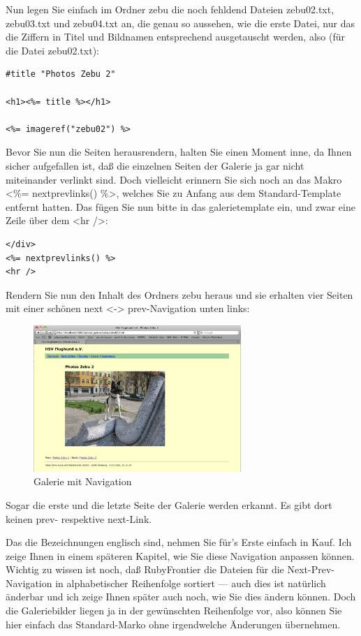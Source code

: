 \documentclass[11pt]{report}
\begin{document}
Nun legen Sie einfach im Ordner zebu die noch fehldend Dateien
zebu02.txt, zebu03.txt und zebu04.txt an, die genau so aussehen, wie
die erste Datei, nur das die Ziffern in Titel und Bildnamen
entsprechend ausgetauscht werden, also (für die Datei zebu02.txt):


\begin{verbatim}
#title "Photos Zebu 2"

<h1><%= title %></h1>

<%= imageref("zebu02") %>
\end{verbatim}

Bevor Sie nun die Seiten herausrendern, halten Sie einen Moment inne,
da Ihnen sicher aufgefallen ist, daß die einzelnen Seiten der Galerie
ja gar nicht miteinander verlinkt sind. Doch vielleicht erinnern Sie
sich noch an das Makro <\%= nextprevlinks() \%>, welches Sie zu Anfang
aus dem Standard-Template entfernt hatten. Das fügen Sie nun bitte in
das galerietemplate ein, und zwar eine Zeile über dem <hr />:


\begin{verbatim}
</div>
<%= nextprevlinks() %>
<hr />
\end{verbatim}

Rendern Sie nun den Inhalt des Ordners zebu heraus und sie erhalten
vier Seiten mit einer schönen next <-> prev-Navigation unten links:

\begin{figure}[h!]
\centering
\includegraphics[width=0.7\textwidth]{./images/galerie05.png}
\caption{\label{galerie05}Galerie mit Navigation}
\end{figure}

Sogar die erste und die letzte Seite der Galerie werden erkannt. Es
gibt dort keinen prev- respektive next-Link.


Das die Bezeichnungen englisch sind, nehmen Sie für’s Erste einfach in
Kauf. Ich zeige Ihnen in einem späteren Kapitel, wie Sie diese
Navigation anpassen können. Wichtig zu wissen ist noch, daß
RubyFrontier die Dateien für die Next-Prev-Navigation in
alphabetischer Reihenfolge sortiert — auch dies ist natürlich änderbar
und ich zeige Ihnen später auch noch, wie Sie dies ändern können. Doch
die Galeriebilder liegen ja in der gewünschten Reihenfolge vor, also
können Sie hier einfach das Standard-Marko ohne irgendwelche
Änderungen übernehmen.
\end{document}
